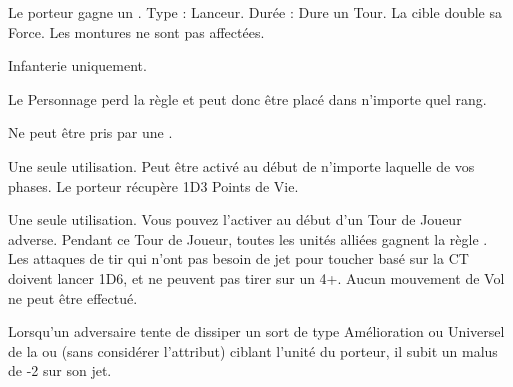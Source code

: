 \startpricelist

 Le porteur gagne un .\newline
Type : Lanceur. Durée : Dure un Tour.\newline
La cible double sa Force. Les montures ne sont pas affectées.

\endpricelist

\armyenchanteditems

\startpricelist

Infanterie uniquement.

Le Personnage perd la règle \firstinrank{} et peut donc être placé dans n'importe quel rang.

Ne peut être pris par une \largetarget{}.

Une seule utilisation. Peut être activé au début de n'importe laquelle de vos phases. Le porteur récupère 1D3 Points de Vie.

\endpricelist

\armymagicalbanners

\startpricelist

Une seule utilisation. Vous pouvez l'activer au début d'un Tour de Joueur adverse. Pendant ce Tour de Joueur, toutes les unités alliées gagnent la règle \hardtarget{}. Les attaques de tir qui n'ont pas besoin de jet pour toucher basé sur la CT doivent lancer 1D6, et ne peuvent pas tirer sur un 4+. Aucun mouvement de Vol ne peut être effectué.

Lorsqu'un adversaire tente de dissiper un sort de type Amélioration ou Universel de la \Pathof{} \ruin{} ou \disease{} (sans considérer l'attribut) ciblant l'unité du porteur, il subit un malus de -2 sur son jet.

\endpricelist

\closearmymagicalitems








\quickrefsheettitle

